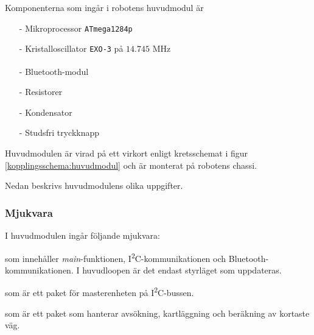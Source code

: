 \documentclass[11pt]{article}
\begin{document}
\begin{flushleft}
Komponenterna som ingår i robotens huvudmodul är 
\begin{itemize}
\item[-] Mikroprocessor \verb+ATmega1284p+
\item[-] Kristalloscillator \verb+EXO-3+ på $14.745$ MHz
\item[-] Bluetooth\textsuperscript{\circledR}-modul
\item[-] Resistorer
\item[-] Kondensator
\item[-] Studsfri tryckknapp
\end{itemize}

Huvudmodulen är virad på ett virkort enligt kretsschemat i figur \ref{kopplingsschema:huvudmodul} och är monterat på robotens chassi. 

Nedan beskrivs huvudmodulens olika uppgifter.

\subsubsection{Mjukvara}
I huvudmodulen ingår följande mjukvara:

\begin{description}[style=unboxed, leftmargin=0cm]
\item[huvudMain.c] som innehåller \textit{main}-funktionen, I\textsuperscript{2}C-kommunikationen och Bluetooth\textsuperscript{\circledR}-kommunikationen. I huvudloopen är det endast styrläget som uppdateras.
\item[I2C\_master.h] som är ett paket för masterenheten på I\textsuperscript{2}C-bussen.
\item[searchPath.h] som är ett paket som hanterar avsökning, kartläggning och beräkning av kortaste väg.
\end{description}


\end{flushleft}
\end{document}
